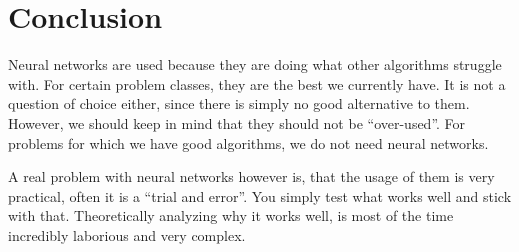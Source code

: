 \section{Conclusion}
\label{sec:conclusion}

Neural networks are used because they are doing what other algorithms struggle with.
For certain problem classes, they are the best we currently have.
It is not a question of choice either, since there is simply no good alternative to them.
However, we should keep in mind that they should not be \enquote{over-used}.
For problems for which we have good algorithms, we do not need neural networks.

A real problem with neural networks however is, that the usage of them is very practical,
often it is a \enquote{trial and error}.
You simply test what works well and stick with that.
Theoretically analyzing why it works well, is most of the time incredibly laborious and very complex.